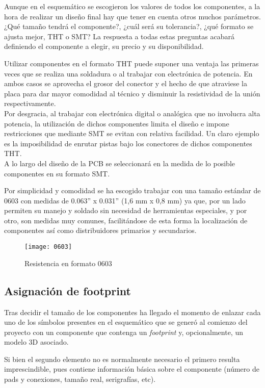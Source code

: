 Aunque en el esquemático se escogieron los valores de todos los componentes, a la hora de realizar un diseño final hay que tener en cuenta otros muchos parámetros. ¿Qué tamaño tendrá el componente?, ¿cuál será su tolerancia?, ¿qué formato se ajusta mejor, \acrshort{THT} o \acrshort{SMT}? La respuesta a todas estas preguntas acabará definiendo el componente a elegir, su precio y su disponibilidad.

Utilizar componentes en el formato THT puede suponer una ventaja las primeras veces que se realiza una soldadura o al trabajar con electrónica de potencia. En ambos casos se aprovecha el grosor del conector y el hecho de que atraviese la placa para dar mayor comodidad al técnico y disminuir la resistividad de la unión respectivamente. 
\\Por desgracia, al trabajar con electrónica digital o analógica que no involucra alta potencia, la utilización de dichos componentes limita el diseño e impone restricciones que mediante SMT se evitan con relativa facilidad. Un claro ejemplo es la imposibilidad de enrutar pistas bajo los conectores de dichos componentes THT.
\\A lo largo del diseño de la PCB se seleccionará en la medida de lo posible componentes en su formato SMT.

Por simplicidad y comodidad se ha escogido trabajar con una tamaño estándar de 0603 con medidas de 0.063'' x 0.031'' (1,6 mm x 0,8 mm) ya que, por un lado permiten su manejo y soldado sin necesidad de herramientas especiales, y por otro, son medidas muy comunes, facilitándose de esta forma la localización de componentes así como distribuidores primarios y secundarios.

\begin{figure} [h]
    \centering
    \texttt{[image: 0603]}
    \caption{Resistencia en formato 0603 \cite{Imagen_0603}}
    \label{fig:0603}
\end{figure}

\subsection{Asignación de footprint\label{sec:Enlazado}}

Tras decidir el tamaño de los componentes ha llegado el momento de enlazar cada uno de los símbolos presentes en el esquemático que se generó al comienzo del proyecto con un componente que contenga un \textit{footprint} y, opcionalmente, un modelo 3D asociado.

Si bien el segundo elemento no es normalmente necesario el primero resulta imprescindible, pues contiene información básica sobre el componente (número de pads y conexiones, tamaño real, serigrafías, etc). 

